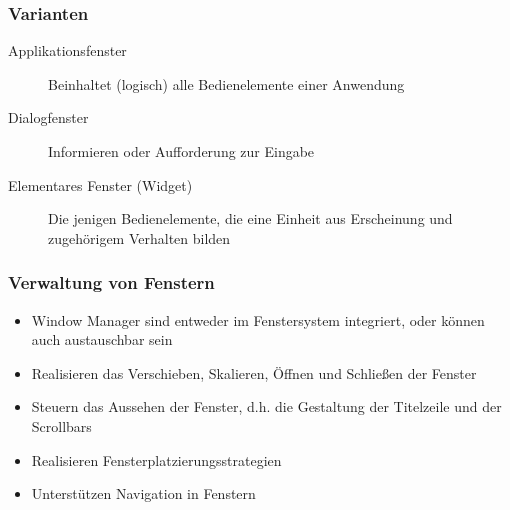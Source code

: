 \documentclass
[
	8pt,		%
	ngerman,	%
	a4paper,	%
	landscape,	%
	final		%
]{extarticle}
\begin{document}
\begin{multicols*}{4}
	\subsubsection{Varianten}
	\begin{description}
		\item[Applikationsfenster] Beinhaltet (logisch) alle Bedienelemente
		      einer Anwendung
		\item[Dialogfenster] Informieren oder Aufforderung zur Eingabe
		\item[Elementares Fenster (Widget)] Die jenigen Bedienelemente, die eine
		      Einheit aus Erscheinung und zugehörigem Verhalten bilden
	\end{description}
	\subsubsection{Verwaltung von Fenstern}
	\begin{itemize}
		\item Window Manager sind entweder im Fenstersystem integriert, oder
		      können auch austauschbar sein
		\item Realisieren das Verschieben, Skalieren, Öffnen und Schließen der
		      Fenster
		\item Steuern das Aussehen der Fenster, d.h. die Gestaltung der
		      Titelzeile und der Scrollbars
		\item Realisieren Fensterplatzierungsstrategien
		\item Unterstützen Navigation in Fenstern
	\end{itemize}

\end{multicols*}
\end{document}
